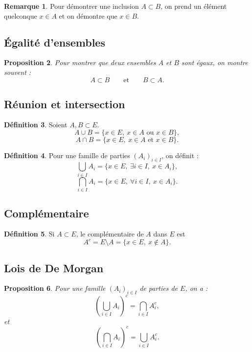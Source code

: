 \documentclass[11pt,a4paper]{article}
\theoremstyle{definition}
\newtheorem{definition}{Définition}[section]
\newtheorem{remarque}[definition]{Remarque}
\theoremstyle{plain}
\newtheorem{proposition}[definition]{Proposition}
\begin{document}
\begin{remarque}
Pour démontrer une inclusion $A\subset B$, on prend un élément quelconque $x\in A$ et on démontre que $x\in B$.
\end{remarque}

\subsection{Égalité d'ensembles}

\begin{proposition}
Pour montrer que deux ensembles $A$ et $B$ sont égaux, on montre souvent :
\[
A\subset B
\qquad \text{et} \qquad
B\subset A.
\]
\end{proposition}

\subsection{Réunion et intersection}

\begin{definition}
Soient $A,B\subset E$.
\[
A\cup B=\{x\in E,\ x\in A \text{ ou } x\in B\},
\]
\[
A\cap B=\{x\in E,\ x\in A \text{ et } x\in B\}.
\]
\end{definition}

\begin{definition}
Pour une famille de parties $(A_i)_{i\in I}$, on définit :
\[
\bigcup_{i\in I}A_i
=
\{x\in E,\ \exists i\in I,\ x\in A_i\},
\]
\[
\bigcap_{i\in I}A_i
=
\{x\in E,\ \forall i\in I,\ x\in A_i\}.
\]
\end{definition}

\subsection{Complémentaire}

\begin{definition}
Si $A\subset E$, le complémentaire de $A$ dans $E$ est
\[
A^c=E\setminus A=\{x\in E,\ x\notin A\}.
\]
\end{definition}

\subsection{Lois de De Morgan}

\begin{proposition}
Pour une famille $(A_i)_{i\in I}$ de parties de $E$, on a :
\[
\left(\bigcup_{i\in I} A_i\right)^c
=
\bigcap_{i\in I} A_i^c,
\]
et
\[
\left(\bigcap_{i\in I} A_i\right)^c
=
\bigcup_{i\in I} A_i^c.
\]
\end{proposition}
\end{document}
